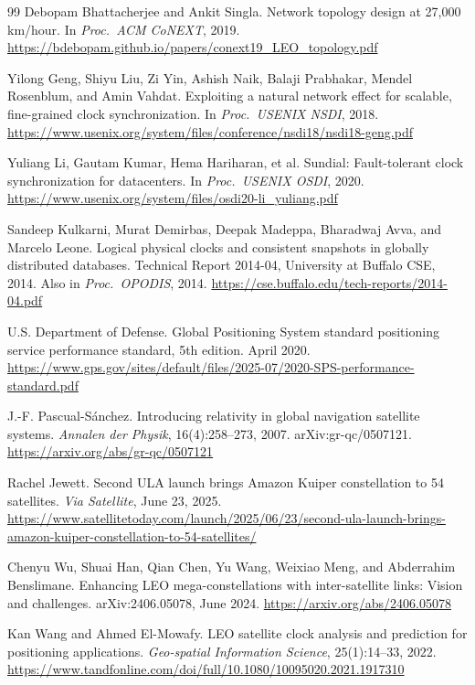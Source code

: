 \documentclass[twocolumn,10pt]{article}
\begin{document}
\begin{thebibliography}{99}
Debopam Bhattacherjee and Ankit Singla.
Network topology design at 27,000 km/hour.
In \textit{Proc.\ ACM CoNEXT}, 2019.
\url{https://bdebopam.github.io/papers/conext19_LEO_topology.pdf}

Yilong Geng, Shiyu Liu, Zi Yin, Ashish Naik, Balaji Prabhakar, Mendel Rosenblum, and Amin Vahdat.
Exploiting a natural network effect for scalable, fine-grained clock synchronization.
In \textit{Proc.\ USENIX NSDI}, 2018.
\url{https://www.usenix.org/system/files/conference/nsdi18/nsdi18-geng.pdf}

Yuliang Li, Gautam Kumar, Hema Hariharan, et al.
Sundial: Fault-tolerant clock synchronization for datacenters.
In \textit{Proc.\ USENIX OSDI}, 2020.
\url{https://www.usenix.org/system/files/osdi20-li_yuliang.pdf}

Sandeep Kulkarni, Murat Demirbas, Deepak Madeppa, Bharadwaj Avva, and Marcelo Leone.
Logical physical clocks and consistent snapshots in globally distributed databases.
Technical Report 2014-04, University at Buffalo CSE, 2014. Also in \textit{Proc.\ OPODIS}, 2014.
\url{https://cse.buffalo.edu/tech-reports/2014-04.pdf}

U.S. Department of Defense.
Global Positioning System standard positioning service performance standard, 5th edition.
April 2020.
\url{https://www.gps.gov/sites/default/files/2025-07/2020-SPS-performance-standard.pdf}

J.-F. Pascual-S\'anchez.
Introducing relativity in global navigation satellite systems.
\textit{Annalen der Physik}, 16(4):258--273, 2007. arXiv:gr-qc/0507121.
\url{https://arxiv.org/abs/gr-qc/0507121}

Rachel Jewett.
Second ULA launch brings Amazon Kuiper constellation to 54 satellites.
\textit{Via Satellite}, June 23, 2025.
\url{https://www.satellitetoday.com/launch/2025/06/23/second-ula-launch-brings-amazon-kuiper-constellation-to-54-satellites/}

Chenyu Wu, Shuai Han, Qian Chen, Yu Wang, Weixiao Meng, and Abderrahim Benslimane.
Enhancing LEO mega-constellations with inter-satellite links: Vision and challenges.
arXiv:2406.05078, June 2024.
\url{https://arxiv.org/abs/2406.05078}

Kan Wang and Ahmed El-Mowafy.
LEO satellite clock analysis and prediction for positioning applications.
\textit{Geo-spatial Information Science}, 25(1):14--33, 2022.
\url{https://www.tandfonline.com/doi/full/10.1080/10095020.2021.1917310}


\end{thebibliography}
\end{document}
